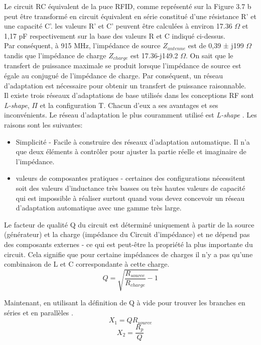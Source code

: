 \documentclass[11pt, a4paper, twoside]{book}
\begin{document}
Le circuit RC équivalent de la puce RFID, comme représenté sur la Figure 3.7 b peut être transformé en circuit équivalent en série constitué d'une résistance  R' et une capacité C'. les valeurs R' et C'  peuvent être calculées à environ 17.36 \(\Omega\) et 1,17 pF respectivement sur la base des valeurs R et C indiqué ci-dessus.\\


Par conséquent, à 915 MHz, l'impédance de source \(Z_{antenne} \) est de 0,39 ± j199 \(\Omega\) tandis que l'impédance de charge \(Z_{charge} \) est 17.36-j149.2 \(\Omega\). On sait que le transfert de puissance maximale se produit lorsque l'impédance de source est égale au conjugué de l'impédance de charge. Par conséquent, un réseau d'adaptation est nécessaire pour obtenir un transfert de puissance raisonnable.\\

Il existe trois réseaux d'adaptations de base utilisés dans les conceptions RF sont \emph{L-shape}, \(\Pi\) et la configuration T. Chacun d'eux a ses avantages et ses inconvénients. Le réseau d'adaptation le plus couramment utilisé est \emph{L-shape} . Les raisons sont les suivantes:
\begin{itemize}
\item Simplicité - Facile à construire des réseaux d'adaptation automatique. Il n'a que deux éléments à contrôler pour ajuster la partie réelle et imaginaire de l'impédance.
\item valeurs de composantes pratiques - certaines des configurations nécessitent soit des valeurs d'inductance très basses ou très hautes valeurs de capacité qui est impossible à réaliser surtout quand vous devez concevoir un réseau d'adaptation automatique avec une gamme très large.\\
\end{itemize}

Le facteur de qualité Q du circuit est déterminé uniquement à partir de la source (générateur) et la charge (impédance du Circuit d'impédance) et ne dépend pas des composants externes - ce qui est peut-être la propriété la plus importante du circuit. Cela signifie que pour certaine impédances de charges il n'y a pas qu'une combinaison de L et C correspondante à cette charge.
\begin{equation}
Q = \sqrt{\dfrac{R_{source}}{R_{charge}}-1}
\end{equation}

Maintenant, en utilisant la définition de Q à vide pour trouver les branches en séries et en parallèles .
\begin{equation}
X_{1}=QR_{source}
\end{equation}
\begin{equation}
X_{2}=\dfrac{R_{p}}{Q}
\end{equation}
\end{document}
